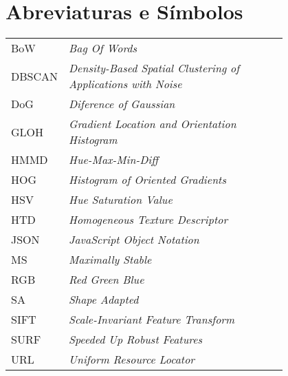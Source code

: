 \chapter*{Abreviaturas e Símbolos}

\begin{flushleft}
\begin{tabular}{l p{0.8\linewidth}}
BoW		 & \textit{Bag Of Words}\\
DBSCAN   & \textit{Density-Based Spatial Clustering of Applications with Noise}\\
DoG      & \textit{Diference of Gaussian}\\
GLOH     & \textit{Gradient Location and Orientation Histogram}\\
HMMD     & \textit{Hue-Max-Min-Diff}\\
HOG      & \textit{Histogram of Oriented Gradients}\\
HSV 	 & \textit{Hue Saturation Value}\\
HTD      & \textit{Homogeneous Texture Descriptor} \\
JSON	 & \textit{JavaScript Object Notation}\\
MS		 & \textit{Maximally Stable}\\
RGB 	 & \textit{Red Green Blue}\\
SA		 & \textit{Shape Adapted}\\
SIFT     & \textit{Scale-Invariant Feature Transform}\\
SURF     & \textit{Speeded Up Robust Features}\\
URL		 & \textit{Uniform Resource Locator}



\end{tabular}
\end{flushleft}

